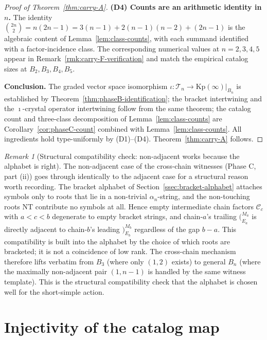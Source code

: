 \documentclass[11pt]{article}
\theoremstyle{definition}
\theoremstyle{remark}
\newtheorem{remark}[theorem]{Remark}
\newcommand{\Kp}{\mathrm{Kp}}
\newcommand{\NT}{\mathrm{NT}}
\newcommand{\Cmid}{\mathcal{C}}
\newcommand{\TT}{\mathcal{T}}
\newcommand{\labr}[1]{{)}_{#1}}
\newcommand{\labl}[1]{{(}_{#1}}
\begin{document}
\begin{proof}[Proof of Theorem~\ref{thm:carry-A}]
\smallskip
\noindent\textbf{(D4) Counts are an arithmetic identity in $n$.} The identity
$\binom{2n}{2} = n(2n - 1) = 3(n-1) + 2(n-1)(n-2) + (2n-1)$ is the algebraic
content of Lemma~\ref{lem:class-counts}, with each summand identified with a
factor-incidence class. The corresponding numerical values at $n = 2, 3, 4, 5$
appear in Remark~\ref{rmk:carry-F-verification} and match the empirical catalog
sizes at $B_2, B_3, B_4, B_5$.

\smallskip
\noindent\textbf{Conclusion.} The graded vector space isomorphism
$\iota: \TT_n \to \Kp(\infty)|_{B_n}$
is established by Theorem~\ref{thm:phaseB-identification}; the bracket
intertwining and the $\imath$-crystal operator intertwining follow from the same
theorem; the catalog count and three-class decomposition
of Lemma~\ref{lem:class-counts} are
Corollary~\ref{cor:phaseC-count} combined with
Lemma~\ref{lem:class-counts}. All ingredients hold type-uniformly by (D1)--(D4).
Theorem~\ref{thm:carry-A} follows.
\end{proof}

\begin{remark}[Structural compatibility check: non-adjacent works because the alphabet is right]\label{rmk:non-adjacent-compatibility}
The non-adjacent case of the cross-chain witnesses (Phase C, part (ii)) goes
through identically to the adjacent case for a structural reason worth recording.
The bracket alphabet of Section~\ref{ssec:bracket-alphabet} attaches symbols only
to roots that lie in a non-trivial $\alpha_n$-string, and the non-touching roots
$\NT$ contribute no symbols at all. Hence empty intermediate chain factors
$\Cmid_c$ with $a < c < b$ degenerate to empty bracket strings, and chain-$a$'s
trailing $\labl{E_a}^{M_a}$ is directly adjacent to chain-$b$'s leading
$\labr{E_b}^{M_b}$ regardless of the gap $b - a$. This compatibility is built
into the alphabet by the choice of which roots are bracketed; it is not a
coincidence of low rank. The cross-chain mechanism therefore lifts verbatim from
$B_3$ (where only $(1, 2)$ exists) to general $B_n$ (where the maximally
non-adjacent pair $(1, n-1)$ is handled by the same witness template). This is
the structural compatibility check that the alphabet is chosen well for the
short-simple action.
\end{remark}

\appendix
\section{Injectivity of the catalog map}\label{sec:appendix-injectivity}
\end{document}

